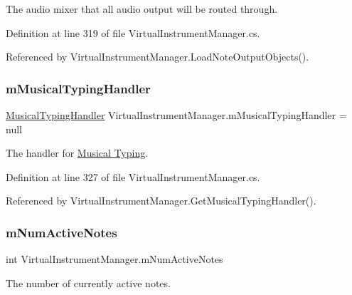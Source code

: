 The audio mixer that all audio output will be routed through. 



Definition at line 319 of file Virtual\+Instrument\+Manager.\+cs.



Referenced by Virtual\+Instrument\+Manager.\+Load\+Note\+Output\+Objects().

\mbox{\label{group___v_i_m_priv_gad7b95bd21383d11ea0cbf33d79b78e09}} 
\subsubsection{\texorpdfstring{m\+Musical\+Typing\+Handler}{mMusicalTypingHandler}}
{\footnotesize\ttfamily \hyperlink{class_musical_typing_handler}{Musical\+Typing\+Handler} Virtual\+Instrument\+Manager.\+m\+Musical\+Typing\+Handler = null\hspace{0.3cm}{\ttfamily [private]}}



The handler for \hyperlink{class_musical_typing_handler}{Musical Typing}. 



Definition at line 327 of file Virtual\+Instrument\+Manager.\+cs.



Referenced by Virtual\+Instrument\+Manager.\+Get\+Musical\+Typing\+Handler().

\mbox{\label{group___v_i_m_priv_ga0f7e11945763c48057be326b661dfdaf}} 
\subsubsection{\texorpdfstring{m\+Num\+Active\+Notes}{mNumActiveNotes}}
{\footnotesize\ttfamily int Virtual\+Instrument\+Manager.\+m\+Num\+Active\+Notes\hspace{0.3cm}{\ttfamily [private]}}



The number of currently active notes. 



